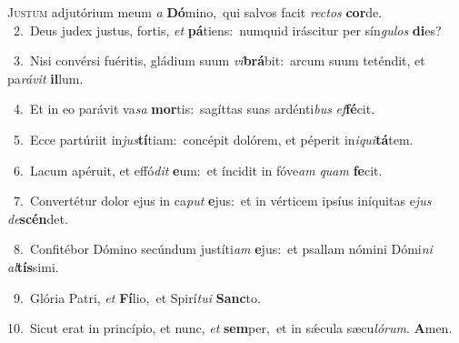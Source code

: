 \lettrine{\initial\textcolor{\initialcolor}{J}}{ustum} adjutórium meum \textit{a} \textbf{Dó}\-mino,~\star qui salvos facit \textit{rec}\-\textit{tos} \textbf{cor}\-de.\\
{\numbfont\textcolor{\numbcolor}{~2.}}~Deus judex justus, fortis, \textit{et} \textbf{pá}\-tiens:~\star numquid iráscitur per sín\-\textit{gu}\-\textit{los} \textbf{di}\-es?\par
{\numbfont\textcolor{\numbcolor}{~3.}}~Nisi convérsi fuéritis, gládium suum \textit{vi}\-\textbf{brá}bit:~\star arcum suum teténdit, et pa\-\textit{rá}\-\textit{vit} \textbf{il}\-lum.\par
{\numbfont\textcolor{\numbcolor}{~4.}}~Et in eo parávit va\textit{sa} \textbf{mor}\-tis:~\star sagíttas suas ardénti\textit{bus} \textit{ef}\-\textbf{fé}cit.\par
{\numbfont\textcolor{\numbcolor}{~5.}}~Ecce partúriit in\-\textit{jus}\-\textbf{tí}tiam:~\star concépit dolórem, et péperit in\-\textit{i}\-\textit{qui}\textbf{tá}tem.\par
{\numbfont\textcolor{\numbcolor}{~6.}}~Lacum apéruit, et effó\textit{dit} \textbf{e}\-um:~\star et íncidit in fóve\textit{am} \textit{quam} \textbf{fe}\-cit.\par
{\numbfont\textcolor{\numbcolor}{~7.}}~Convertétur dolor ejus in ca\textit{put} \textbf{e}\-jus:~\star et in vérticem ipsíus iníquitas e\textit{jus} \textit{de}\-\textbf{scén}det.\par
{\numbfont\textcolor{\numbcolor}{~8.}}~Confitébor Dómino secúndum justíti\textit{am} \textbf{e}\-jus:~\star et psallam nómini Dómi\textit{ni} \textit{al}\-\textbf{tís}simi.\par
{\numbfont\textcolor{\numbcolor}{~9.}}~Glória Patri, \textit{et} \textbf{Fí}\-lio,~\star et Spirí\-\textit{tu}\-\textit{i} \textbf{Sanc}\-to.\par
{\numbfont\textcolor{\numbcolor}{10.}}~Sicut erat in princípio, et nunc, \textit{et} \textbf{sem}\-per,~\star et in sǽcula sæcu\-\textit{ló}\-\textit{rum}. \textbf{A}\-men.\par

